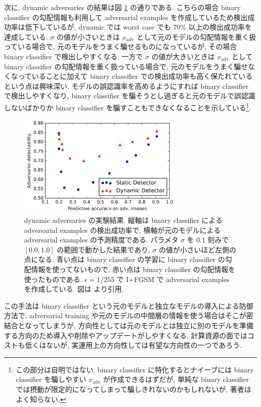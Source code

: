 次に, dynamic adversaries の結果は図 \ref{fig:on-detecting-dynamical-exp} の通りである.
こちらの場合 binary classifier の勾配情報も利用して adversarial examples を作成しているため検出成功率は低下しているが, dynamic では worst case でも 70\% 以上の検出成功率を達成している.
$\sigma$ の値が小さいときは $x_{\text{adv}}$ として元のモデルの勾配情報を重く扱っている場合で, 元のモデルをうまく騙せるものになっているが, その場合 binary classifier で検出しやすくなる.
一方で $\sigma$ の値が大きいときは $x_{\text{adv}}$ として binary classifier の勾配情報を重く扱っている場合で, 元のモデルをうまく騙せなくなっていることに加えて binary classifier での検出成功率も高く保たれているという点は興味深い.
モデルの誤認識率を高めるようにすれば binary classifier で検出しやすくなり, binary classifier を騙そうとし過ぎると元のモデルで誤認識しないばかりか binary classifier を騙すこともできなくなることを示している\footnote{
この部分は自明ではない.
binary classifier に特化するとナイーブには binary classifier を騙しやすい $x_{\text{adv}}$ が作成できるはずだが, 単純な binary classifier では摂動が限定的になってしまって騙しきれないのかもしれないが, 著者はよく知らない.
}.
%
\begin{figure}[htbp]
\begin{center}
\includegraphics[width=8.0cm]{figures/on-detecting-dynamical-exp.pdf}
\end{center}
\caption{
dynamic adversaries の実験結果.
縦軸は binary classifier による adversarial examples の検出成功率で, 横軸が元のモデルによる adversarial examples の予測精度である.
パラメタ $\sigma$ を $0.1$ 刻みで $[0.0, 1.0]$ の範囲で動かした結果であり, $\sigma$ の値が小さいほど左側の点になる.
青い点は binary classifier の学習に binary classifier の勾配情報を使ってないもので, 赤い点は binary classifier の勾配情報を使ったものである.
$\epsilon = 1 / 255$ で I+FGSM で adversarial examples を作成している.
図は \cite{metzen2017detecting} より引用.
}
\label{fig:on-detecting-dynamical-exp}
\end{figure}

この手法は binary classifier という元のモデルと独立なモデルの導入による防御方法で, adversarial training や元のモデルの中間層の情報を使う場合はそこが密結合となってしまうが, 方向性としては元のモデルとは独立に別のモデルを準備する方向のため導入や削除やアップデートがしやすくなる.
計算資源の面ではコストも低くはないが, 実運用上の方向性しては有望な方向性の一つであろう.



